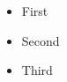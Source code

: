 \documentclass{ltx-talk}
\begin{document}
\begin{frame}
  \begin{itemize}[<alert@+>]
    \item First
    \item Second
    \item Third
  \end{itemize}
\end{frame}
\end{document}
